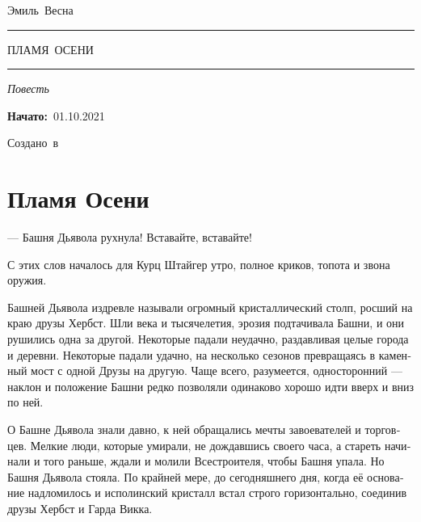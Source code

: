 \documentclass[a4paper,10pt,fleqn]{book}\usepackage{polyglossia}\setdefaultlanguage[babelshorthands=true]{russian}\setotherlanguage{english}\defaultfontfeatures{Ligatures=TeX,Mapping=tex-text}\usepackage{xcolor}\newcommand{\ml}[3]{#2}
\newcommand{\tofaauthor}{\ml{$0$}{Эмиль~Весна}{Emil~Viesn\'{a}}}
\newcommand{\tofatitle}{\ml{$0$}{ПЛАМЯ~ОСЕНИ}{Flame~of~the~Fall}}
\newcommand{\tofastarted}{01.10.2021}
\newcommand{\asterism}{\vspace{1em}{\centering\Large\bfseries$\ast~\ast~\ast$\par}\vspace{1em}}
\begin{document}

\begin{titlepage}
{\centering{~\par}\vspace{0.25\textheight}
{\LARGE\tofaauthor}\par
\vspace{1.0cm}\rule{17em}{1pt}\par\vspace{0.3cm}
{\Huge\textsc{\tofatitle}\par}
\vspace{0.3cm}\rule{17em}{2pt}\par\vspace{1.0cm}
{\Large\textit{\ml{$0$}{Повесть}{Novella}}\par}
\vspace{0.5cm}\asterism\par\vspace{1.0cm}
{\textbf{\ml{$0$}{Начато:}{Started:}}~\tofastarted\par}\vfill
{\Large\ml{$0$}{Создано~в}{Created~by}~\XeLaTeX}\par}
\end{titlepage}

\tableofcontents

\chapter{Пламя Осени}

--- Башня Дьявола рухнула!
Вставайте, вставайте!

С этих слов началось для Курц Штайгер утро, полное криков, топота и звона оружия.

Башней Дьявола издревле называли огромный кристаллический столп, росший на краю друзы Хербст.
Шли века и тысячелетия, эрозия подтачивала Башни, и они рушились одна за другой.
Некоторые падали неудачно, раздавливая целые города и деревни.
Некоторые падали удачно, на несколько сезонов превращаясь в каменный мост с одной Друзы на другую.
Чаще всего, разумеется, односторонний --- наклон и положение Башни редко позволяли одинаково хорошо идти вверх и вниз по ней.

О Башне Дьявола знали давно, к ней обращались мечты завоевателей и торговцев.
Мелкие люди, которые умирали, не дождавшись своего часа, а стареть начинали и того раньше, ждали и молили Всестроителя, чтобы Башня упала.
Но Башня Дьявола стояла.
По крайней мере, до сегодняшнего дня, когда её основание надломилось и исполинский кристалл встал строго горизонтально, соединив друзы Хербст и Гарда Викка.
\end{document}

